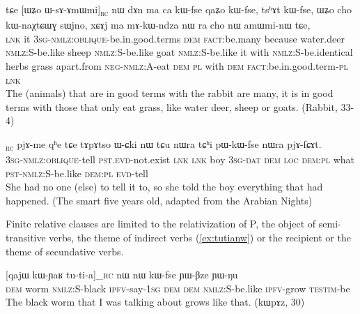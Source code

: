 \documentclass[oldfontcommands,oneside,a4paper,11pt]{article}
\newcommand{\ipa}[1]{{\phon #1}} %
\newcommand{\topic}{\textsc{dem}}
\newcommand{\rc}{\textsubscript{\textsc{rc}}}
\begin{document}
     \begin{exe}
   \ex \label{ex:WsAmWmi}
 \gll 
\ipa{tɕe}   	[\ipa{ɯʑo}   	\ipa{ɯ-sɤ-ɤmɯmi}]\rc{}   	\ipa{nɯ}   	\ipa{dɤn}   	\ipa{ma}   	\ipa{ca}   	\ipa{kɯ-fse}   	\ipa{qaʑo}   	\ipa{kɯ-fse,}   	\ipa{tsʰɤt}   	\ipa{kɯ-fse,}   	 \ipa{ɯʑo}   	\ipa{cho}   	\ipa{kɯ-naχtɕɯɣ}   	\ipa{sɯjno,}   	\ipa{xɕɤj}   	\ipa{ma}   	\ipa{mɤ-kɯ-ndza}   	\ipa{nɯ} \ipa{ra}   	\ipa{cho}   	\ipa{nɯ}   	\ipa{amɯmi-nɯ}   	\ipa{tɕe,}   \\
\textsc{lnk} it \textsc{3sg-nmlz:oblique}-be.in.good.terms \topic{} \textsc{fact:}be.many because water.deer \textsc{nmlz:S}-be.like sheep \textsc{nmlz:S}-be.like goat  \textsc{nmlz:S}-be.like it with  \textsc{nmlz:S}-be.identical herbs grass apart.from \textsc{neg-nmlz:A}-eat \textsc{dem} \textsc{pl} with \textsc{dem} \textsc{fact}:be.in.good.term-\textsc{pl} \textsc{lnk} \\
\glt The (animals) that are in good terms with the rabbit are many, it is in good terms with those that only eat grass, like water deer, sheep or goats. (Rabbit, 33-4)
\end{exe}

\begin{exe}
\ex \label{ex:WsAfCAt}
\gll
[\ipa{ɯ-sɤ-fɕɤt}]\rc{} 
\ipa{pjɤ-me} 	\ipa{qʰe} 	\ipa{tɕe} 	\ipa{tɤpɤtso} 	\ipa{ɯ-ɕki} 	\ipa{nɯ} 	\ipa{tɕu} 	\ipa{nɯra} 	\ipa{tɕʰi} 	\ipa{pɯ-kɯ-fse} 	\ipa{nɯra} 	\ipa{pjɤ-fɕɤt.} \\
\textsc{3sg-nmlz:oblique}-tell \textsc{pst.evd}-not.exist \textsc{lnk} \textsc{lnk} boy \textsc{3sg-dat} \textsc{dem} \textsc{loc} \textsc{dem:pl} what \textsc{pst-nmlz:S}-be.like  \textsc{dem:pl} \textsc{evd}-tell \\
\glt She had no one (else) to tell it to, so she told the boy everything that had happened. (The smart five years old, adapted from the Arabian Nights)
\end{exe} 

Finite relative clauses are limited to the relativization of P, the object of semi-transitive verbs, the theme of indirect verbs (\ref{ex:tutianw}) or the recipient or the theme of secundative verbs.

     \begin{exe}
   \ex \label{ex:tutianw}
 \gll \ipa{nɯ}  	[\ipa{qajɯ}  	\ipa{kɯ-ɲaʁ}  	\ipa{tu-ti-a}]_{\textsc{rc}}  	\ipa{nɯ}  	\ipa{nɯ}  	\ipa{kɯ-fse}  	\ipa{ɲɯ-βze}  	\ipa{ɲɯ-ŋu}  \\
\textsc{dem} worm \textsc{nmlz:S}-black \textsc{ipfv}-say-\textsc{1sg} \textsc{dem}  \textsc{dem} \textsc{nmlz:S}-be.like \textsc{ipfv}-grow \textsc{testim}-be \\
\glt The black worm that I was talking about grows like that. (\ipa{kɯpɤz}, 30)
\end{exe}
\end{document}
